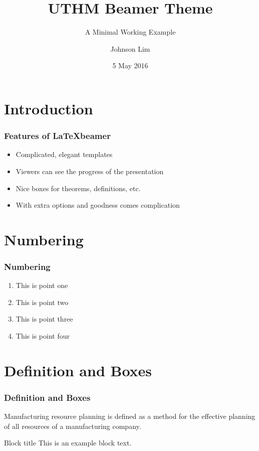 \documentclass{beamer}
\title{UTHM Beamer Theme}
\subtitle{A Minimal Working Example}
\author{Johnson Lim}
\institute{FPTV, UTHM}
\date{5 May 2016}
\begin{document}
\begin{frame}
  \titlepage
\end{frame}


\section{Introduction}

\begin{frame}
  \frametitle{Features of \LaTeX beamer}
\begin{itemize}
	\item Complicated, elegant templates
	\item Viewers can see the progress of the presentation
	\item Nice boxes for theorems, definitions, etc.
	\item With extra options and goodness comes complication
\end{itemize}
\end{frame}

\section{Numbering}
\begin{frame}
	\frametitle{Numbering}
	\begin{enumerate}
		\item This is point one
		\item This is point two
		\item This is point three
		\item This is point four
	\end{enumerate}
\end{frame}


\section{Definition and Boxes}
\begin{frame}
	\frametitle{Definition and Boxes}
	\begin{definition}
		Manufacturing resource planning is defined as a method for the effective planning of all resources of a manufacturing company. 
	\end{definition}
	
	\begin{block}{Block title}
		This is an example block text.
	\end{block}
\end{frame}
\end{document}
